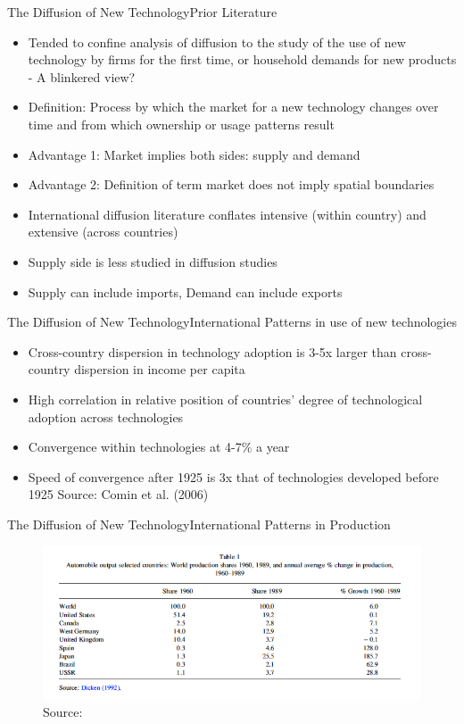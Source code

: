 \documentclass{beamer}
\begin{document}
\begin{frame}{The Diffusion of New Technology}{Prior Literature}
\begin{itemize}
\item{Tended to confine analysis of diffusion to the study of the use of new technology by firms for the first time, or household demands for new products - A blinkered view?}
\item{\cite{Stoneman2010} Definition: Process by which the market for a new technology changes over time and from which ownership or usage patterns result}
\item{Advantage 1: Market implies both sides: supply and demand}
\item{Advantage 2: Definition of term market does not imply spatial boundaries}
\item{International diffusion literature conflates intensive (within country) and extensive (across countries)}
\item{Supply side is less studied in diffusion studies}
\item{Supply can include imports, Demand can include exports}
\end{itemize}
\end{frame}

\begin{frame}{The Diffusion of New Technology}{International Patterns in use of new technologies}
\begin{itemize}
\item{Cross-country dispersion in technology adoption is 3-5x larger than cross-country dispersion in income per capita}
\item{High correlation in relative position of countries' degree of technological adoption across technologies}
\item{Convergence within technologies at 4-7\% a year}
\item{Speed of convergence after 1925 is 3x that of technologies developed before 1925}
Source: Comin et al. (2006)
\end{itemize}
\end{frame}

\begin{frame}{The Diffusion of New Technology}{International Patterns in Production}
\begin{figure}[h]
\begin{centering}
  \includegraphics[width=\textwidth]{stoneman1}
  \caption{Source: \cite{Stoneman2010}}
   \label{fig:stoneman1}
\end{centering}
\end{figure}
\end{frame}
\end{document}
